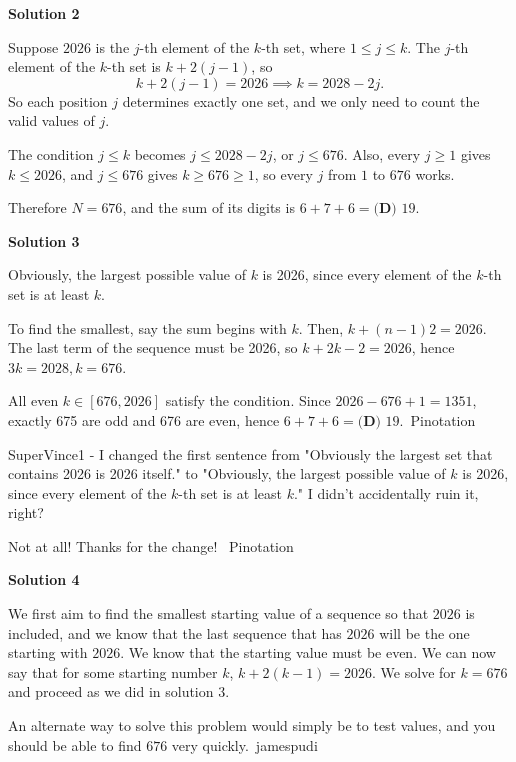 \begin{enumerate}
 



\textbf{Solution 2}

Suppose $2026$ is the $j$-th element of the $k$-th set, where $1 \le j \le k$. The $j$-th element of the $k$-th set is $k + 2(j-1)$, so
 \[k + 2(j - 1) = 2026 \implies k = 2028 - 2j.\]So each position $j$ determines exactly one set, and we only need to count the valid values of $j$.

 The condition $j \le k$ becomes $j \le 2028 - 2j$, or $j \le 676$. Also, every $j \ge 1$ gives $k \le 2026$, and $j \le 676$ gives $k \ge 676 \ge 1$, so every $j$ from $1$ to $676$ works.

 Therefore $N = 676$, and the sum of its digits is $6 + 7 + 6 = \boxed{\textbf{(D) }19}$.

 



\textbf{Solution 3}

Obviously, the largest possible value of $k$ is 2026, since every element of the $k$-th set is at least $k$.

 To find the smallest, say the sum begins with $k$. Then, $k + (n-1)2 = 2026$. The last term of the sequence must be 2026, so $k+2k-2 = 2026$, hence $3k = 2028, k = 676$.

 All even $k \in [676,2026]$ satisfy the condition. Since $2026-676+1 = 1351$, exactly 675 are odd and 676 are even, hence $6 + 7 + 6 = \boxed{\textbf{(D) }19}$.~Pinotation

 SuperVince1 - I changed the first sentence from "Obviously the largest set that contains 2026 is 2026 itself." to "Obviously, the largest possible value of $k$ is 2026, since every element of the $k$-th set is at least $k$." I didn't accidentally ruin it, right?

 Not at all! Thanks for the change! ~Pinotation

 



\textbf{Solution 4}

We first aim to find the smallest starting value of a sequence so that $2026$ is included, and we know that the last sequence that has $2026$ will be the one starting with $2026$. We know that the starting value must be even. We can now say that for some starting number $k$, $k+2(k-1)=2026$. We solve for $k=676$ and proceed as we did in solution $3$. 

 An alternate way to solve this problem would simply be to test values, and you should be able to find $676$ very quickly.~jamespudi


\end{enumerate}
